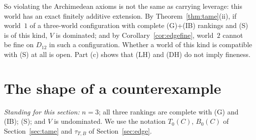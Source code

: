 \documentclass[11pt]{article}
\theoremstyle{definition}\newtheorem{definition}[theorem]{Definition}
\theoremstyle{remark}\newtheorem{remark}[theorem]{Remark}
\begin{document}
So violating the Archimedean axioms is not the same as carrying leverage:
this world has an exact finitely additive extension. By
Theorem~\ref{thm:tame}(ii), if world~$1$ of a three-world configuration with
complete (G)+(IB) rankings and (S) is of this kind, $V$ is dominated; and by
Corollary~\ref{cor:edgefine}, world~$2$ cannot be fine on $D_{12}$ in such a
configuration. Whether a world of this kind is compatible with (S) at all is
open. Part (c) shows that (LH) and (DH) do not imply fineness.

\section{The shape of a counterexample}\label{sec:shape}

\emph{Standing for this section:} $n=3$; all three rankings are complete
with (G) and (IB); (S); and $V$ is undominated. We use the notation
$T_0(C)$, $B_0(C)$ of Section~\ref{sec:tame} and $\tau_{T,B}$ of
Section~\ref{sec:edge}.
\end{document}
